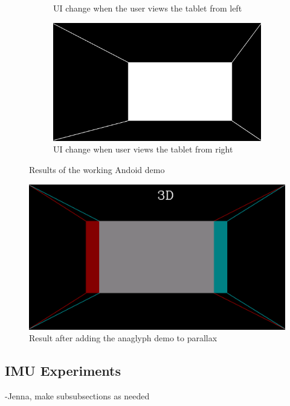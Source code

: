 \documentclass[12pt,twocolumn,letterpaper]{article}
\begin{document}
\begin{figure}
\begin{subfigure}{0.5\textwidth}
\caption{UI change when the user views the tablet from left}
\end{subfigure}
\begin{subfigure}{0.5\textwidth}
\includegraphics[scale=0.09]{images/3dperspective_user_right}
\caption{UI change when user views the tablet from right}
\end{subfigure}
\caption{Results of the working Andoid demo}
\label{fig:androiddemo}
\end{figure}

\begin{figure}
\includegraphics[scale=0.09]{images/anaglyph}
\caption{Result after adding the anaglyph demo to parallax}
\label{fig:androiddemoanaglyph}
\end{figure}

\subsection{IMU Experiments}
    -Jenna, make subsubsections as needed
\end{document}
